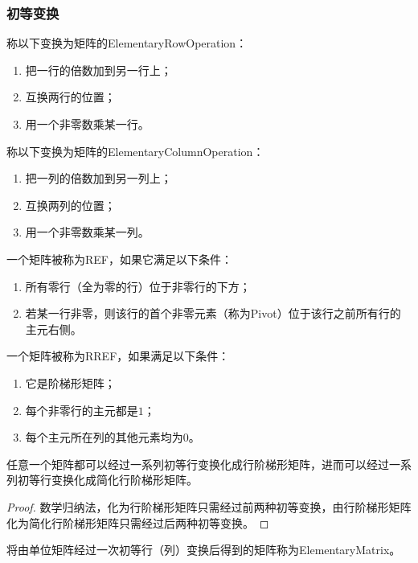 \subsubsection{初等变换}
\begin{definition}
	称以下变换为矩阵的\gls{ElementaryRowOperation}：
	\begin{enumerate}
		\item 把一行的倍数加到另一行上；
		\item 互换两行的位置；
		\item 用一个非零数乘某一行。
	\end{enumerate}
	称以下变换为矩阵的\gls{ElementaryColumnOperation}：
	\begin{enumerate}
		\item 把一列的倍数加到另一列上；
		\item 互换两列的位置；
		\item 用一个非零数乘某一列。
	\end{enumerate}
\end{definition}
\begin{definition}
	一个矩阵被称为\gls{REF}，如果它满足以下条件：
	\begin{enumerate}
		\item 所有零行（全为零的行）位于非零行的下方；
		\item 若某一行非零，则该行的首个非零元素（称为\gls{Pivot}）位于该行之前所有行的主元右侧。
	\end{enumerate}
	一个矩阵被称为\gls{RREF}，如果满足以下条件：
	\begin{enumerate}
		\item 它是阶梯形矩阵；
		\item 每个非零行的主元都是$1$；
		\item 每个主元所在列的其他元素均为$0$。
	\end{enumerate}
\end{definition}
\begin{theorem}\label{theo:RREFExistence}
	任意一个矩阵都可以经过一系列初等行变换化成行阶梯形矩阵，进而可以经过一系列初等行变换化成简化行阶梯形矩阵。
\end{theorem}
\begin{proof}
	数学归纳法，化为行阶梯形矩阵只需经过前两种初等变换，由行阶梯形矩阵化为简化行阶梯形矩阵只需经过后两种初等变换。
\end{proof}
\begin{definition}
	将由单位矩阵经过一次初等行（列）变换后得到的矩阵称为\gls{ElementaryMatrix}。
\end{definition}
